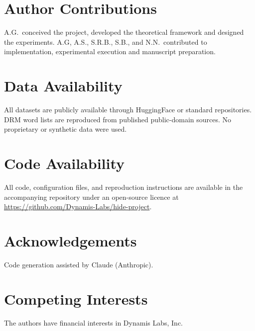 \documentclass[11pt]{article}
\begin{document}
\section*{Author Contributions}
A.G.\ conceived the project, developed the theoretical framework and designed the experiments. A.G, A.S., S.R.B., S.B., and N.N.\ contributed to implementation, experimental execution and manuscript preparation.

\section*{Data Availability}

All datasets are publicly available through HuggingFace or standard repositories. DRM word lists are reproduced from published public-domain sources\cite{roediger1995}. No proprietary or synthetic data were used.

\section*{Code Availability}

All code, configuration files, and reproduction instructions are available in the accompanying repository under an open-source licence at \url{https://github.com/Dynamis-Labs/hide-project}.

\section*{Acknowledgements}

Code generation assisted by Claude (Anthropic).

\section*{Competing Interests}
The authors have financial interests in Dynamis Labs, Inc.

\end{document}
